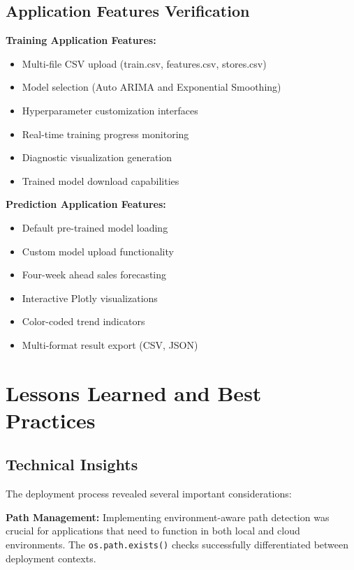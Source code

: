\subsection{Application Features Verification}

\textbf{Training Application Features:}
\begin{itemize}
\item[\checkmark] Multi-file CSV upload (train.csv, features.csv, stores.csv)
\item[\checkmark] Model selection (Auto ARIMA and Exponential Smoothing)
\item[\checkmark] Hyperparameter customization interfaces
\item[\checkmark] Real-time training progress monitoring
\item[\checkmark] Diagnostic visualization generation
\item[\checkmark] Trained model download capabilities
\end{itemize}

\textbf{Prediction Application Features:}
\begin{itemize}
\item[\checkmark] Default pre-trained model loading
\item[\checkmark] Custom model upload functionality
\item[\checkmark] Four-week ahead sales forecasting
\item[\checkmark] Interactive Plotly visualizations
\item[\checkmark] Color-coded trend indicators
\item[\checkmark] Multi-format result export (CSV, JSON)
\end{itemize}

\section{Lessons Learned and Best Practices}

\subsection{Technical Insights}

The deployment process revealed several important considerations:

\textbf{Path Management:} Implementing environment-aware path detection was crucial for applications that need to function in both local and cloud environments. The \texttt{os.path.exists()} checks successfully differentiated between deployment contexts.

